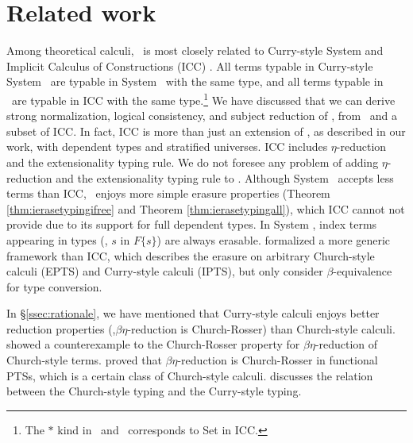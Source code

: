 \section{Related work}
\label{sec:relwork}
Among theoretical calculi, \Fi\ is most closely related to
Curry-style System \Fw \cite{AbeMatUus03,AbeMatUus05,GHR93}
and Implicit Calculus of Constructions (ICC) \cite{Miquel01}.
All terms typable in Curry-style System \Fw\ are typable in System \Fi\ 
with the same type, and all terms typable in \Fi\ are typable in ICC
with the same type.\footnote{The $*$ kind in \Fw\ and \Fi\ corresponds
	to \textsf{Set} in ICC.}
We have discussed that we can derive strong normalization, logical consistency,
and subject reduction of \Fi, from \Fw\ and a subset of ICC.
In fact, ICC is more than just an extension of \Fi, as described in our work,
with dependent types and stratified universes. ICC includes $\eta$-reduction
and the extensionality typing rule. We do not foresee any problem of adding
$\eta$-reduction and the extensionality typing rule to \Fi. Although
System \Fi\ accepts less terms than ICC, \Fi\ enjoys more simple
erasure properties (Theorem \ref{thm:ierasetypingifree} and
Theorem \ref{thm:ierasetypingall}), which ICC cannot not provide
due to its support for full dependent types. In System \Fi, index terms
appearing in types (\eg, $s$ in $F\{s\}$) are always erasable.
\citet{LingerS08} formalized a more generic framework than ICC, which describes
the erasure on arbitrary Church-style calculi (EPTS) and Curry-style calculi
(IPTS), but only consider $\beta$-equivalence for type conversion.

In \S\ref{ssec:rationale}, we have mentioned that Curry-style calculi enjoys
better reduction properties (\eg,$\beta\eta$-reduction is Church-Rosser)
than Church-style calculi. \citet{Nederpelt73} showed a counterexample to
the Church-Rosser property for $\beta\eta$-reduction of Church-style terms.
\citet{Geuvers92} proved that $\beta\eta$-reduction is Church-Rosser
in functional PTSs, which is a certain class of Church-style calculi.
\citet{Seldin08} discusses the relation between the Church-style typing
and the Curry-style typing.

